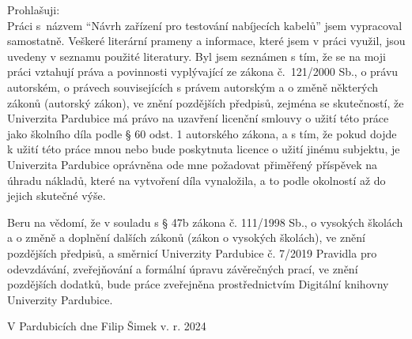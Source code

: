 
Prohlašuji: \\
Práci s názvem “Návrh zařízení pro testování nabíjecích kabelů” jsem vypracoval samostatně. Veškeré literární prameny a informace, které jsem v práci využil, jsou uvedeny v seznamu použité literatury.
Byl jsem seznámen s tím, že se na moji práci vztahují práva a povinnosti vyplývající ze zákona č. 121/2000 Sb., o právu autorském, o právech souvisejících s právem autorským a o změně některých zákonů (autorský zákon), ve znění pozdějších předpisů, zejména se skutečností, že Univerzita Pardubice má právo na uzavření licenční smlouvy o užití této práce jako školního díla podle § 60 odst. 1 autorského zákona, a s tím, že pokud dojde k užití této práce mnou nebo bude poskytnuta licence o užití jinému subjektu, je Univerzita Pardubice oprávněna ode mne požadovat přiměřený příspěvek na úhradu nákladů, které na vytvoření díla vynaložila, a to podle okolností až do jejich skutečné výše.

Beru na vědomí, že v souladu s § 47b zákona č. 111/1998 Sb., o vysokých školách a o změně a doplnění dalších zákonů (zákon o vysokých školách), ve znění pozdějších předpisů, a směrnicí Univerzity Pardubice č. 7/2019 Pravidla pro odevzdávání, zveřejňování a formální úpravu závěrečných prací, ve znění pozdějších dodatků, bude práce zveřejněna prostřednictvím Digitální knihovny Univerzity Pardubice.

V Pardubicích dne \hfill Filip Šimek v. r. 2024